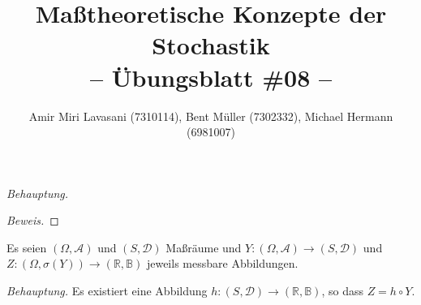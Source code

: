 \documentclass[10pt]{article}
\newcommand{\beh}{\textit{Behauptung. }}
\newenvironment{Aufgabe}[2][Aufgabe]{\begin{trivlist}
\item[\hskip \labelsep {\bfseries #1}\hskip \labelsep {\bfseries #2.}]}{\end{trivlist}}
\begin{document}
 
\title{ \textbf{Maßtheoretische Konzepte der Stochastik \\ -- Übungsblatt \#08 --} }

\author{Amir Miri Lavasani (7310114), Bent Müller (7302332),
        Michael Hermann (6981007)}
\maketitle

\begin{Aufgabe}{1} %
\end{Aufgabe}

\beh

\begin{proof}[Beweis]
\end{proof}

\begin{Aufgabe}{2} %
	Es seien $(\Omega, \mathcal{A})$ und $(S, \mathcal{D})$ Maßräume und $Y:(\Omega, \mathcal{A}) \rightarrow (S, \mathcal{D})$ und $Z:(\Omega, \sigma(Y)) \rightarrow (\mathbb{R}, \mathbb{B})$ jeweils messbare Abbildungen. 
\end{Aufgabe}

\beh Es existiert eine Abbildung $h:(S, \mathcal{D}) \rightarrow  (\mathbb{R}, \mathbb{B})$, so dass $Z = h \circ Y$.
\end{document}
